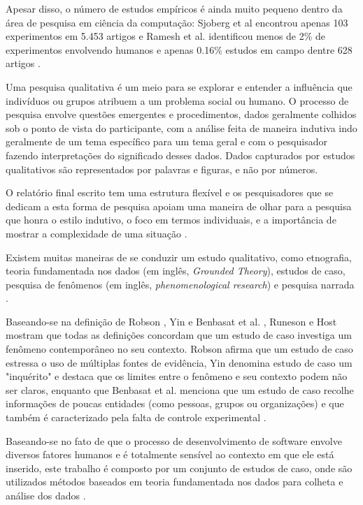 Apesar disso, o número de estudos empíricos é ainda muito pequeno dentro da área
de pesquisa em ciência da computação: Sjoberg et al encontrou apenas 103
experimentos em 5.453 artigos \cite{sjoberg} e Ramesh et al. identificou menos
de 2\% de experimentos envolvendo humanos e apenas 0.16\% estudos em campo 
dentre 628 artigos \cite{ramesh} .

Uma pesquisa qualitativa é um meio para se explorar e entender a influência que 
indivíduos ou grupos atribuem a um problema social ou humano. O processo de
pesquisa envolve questões emergentes e procedimentos, dados geralmente colhidos
sob o ponto de vista do participante, com a análise feita de maneira indutiva
indo  geralmente de um tema específico para um tema geral e com o pesquisador
fazendo interpretações do significado desses dados. Dados capturados por estudos
qualitativos são representados por palavras e figuras, e não por números.

O relatório final escrito tem uma estrutura flexível e os pesquisadores que se
dedicam a esta forma de pesquisa apoiam uma maneira de olhar para a pesquisa que
honra o estilo indutivo, o foco em termos individuais, e a importância de mostrar a 
complexidade de uma situação \cite{creswell}. 

Existem muitas maneiras de se conduzir um estudo qualitativo, como etnografia,
teoria fundamentada nos dados (em inglês, \textit{Grounded Theory}), estudos de 
caso, pesquisa de fenômenos (em inglês, \textit{phenomenological research}) e 
pesquisa narrada \cite{creswell}. 

Baseando-se na definição de Robson \cite{robson}, Yin \cite{yin} e Benbasat et
al. \cite{benbasat}, Runeson e Host mostram que todas as definições concordam
que um estudo de caso investiga um fenômeno contemporâneo no seu contexto. 
Robson afirma que um estudo de caso estressa o uso de múltiplas fontes de
evidência, Yin denomina estudo de caso um "inquérito" e destaca que os limites 
entre o fenômeno e seu contexto podem não ser claros, enquanto que Benbasat et
al. menciona que um estudo de caso recolhe informações de poucas entidades 
(como pessoas, grupos ou organizações) e que também é caracterizado pela  falta
de controle experimental \cite{guidelines-case-study}.

Baseando-se no fato de que o processo de desenvolvimento de software envolve 
diversos fatores humanos e é totalmente sensível ao contexto em que ele está 
inserido, este trabalho é composto por um conjunto de estudos de caso, onde são 
utilizados métodos baseados em teoria fundamentada nos dados para colheta e
análise dos dados \cite{grounded-theory}.


